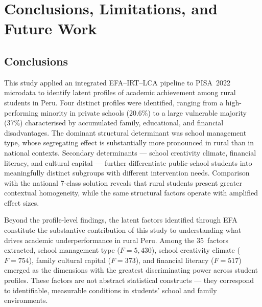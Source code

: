 \documentclass[twocolumn,12pt]{article}
\begin{document}

\section{Conclusions, Limitations, and Future Work}

\subsection{Conclusions}

This study applied an integrated EFA--IRT--LCA pipeline to PISA~2022
microdata to identify latent profiles of academic achievement among rural
students in Peru. Four distinct profiles were identified, ranging from a
high-performing minority in private schools (20.6\%) to a large vulnerable
majority (37\%) characterised by accumulated family, educational, and
financial disadvantages. The dominant structural determinant was school
management type, whose segregating effect is substantially more pronounced
in rural than in national contexts. Secondary determinants --- school
creativity climate, financial literacy, and cultural capital --- further differentiate
public-school students into meaningfully distinct subgroups with
different intervention needs. Comparison with the national 7-class
solution reveals that rural students present greater contextual homogeneity,
while the same structural factors operate with amplified effect sizes.

Beyond the profile-level findings, the latent factors identified through
EFA constitute the substantive contribution of this study to understanding
what drives academic underperformance in rural Peru. Among the 35~factors
extracted, school management type
($F = 5{,}430$), school creativity climate ($F = 754$), family
cultural capital ($F = 373$), and financial literacy ($F = 517$)
emerged as the dimensions with the greatest discriminating power
across student profiles. These factors are not
abstract statistical constructs --- they correspond to identifiable,
measurable conditions in students' school and family environments.
\end{document}
